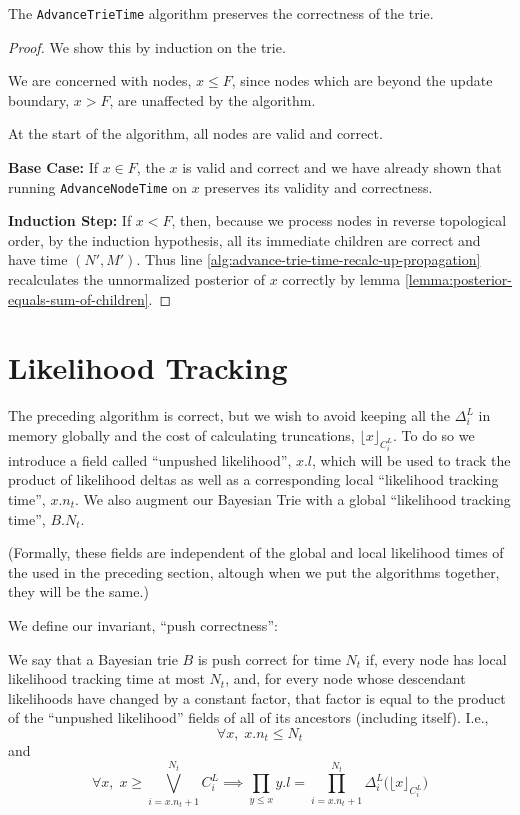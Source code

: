 \begin{theorem}
    The \texttt{AdvanceTrieTime} algorithm preserves the correctness of the trie.
\end{theorem}
\begin{proof}
    We show this by induction on the trie.

    We are concerned with nodes, $x \leq F$, since nodes
    which are beyond the update boundary, $x > F$, are unaffected
    by the algorithm.

    At the start of the algorithm, all nodes are valid and correct.
    
    \textbf{Base Case: } If $x \in F$, the $x$ is valid and correct
    and we have already shown that running \texttt{AdvanceNodeTime} on $x$ preserves its validity and correctness.

    \textbf{Induction Step: } If $x < F$, then, because
    we process nodes in reverse topological order, by the induction hypothesis,
    all its immediate children are correct and have time $(N', M')$.
    Thus line \ref{alg:advance-trie-time-recalc-up-propagation} recalculates the unnormalized posterior of $x$ correctly
    by lemma \ref{lemma:posterior-equals-sum-of-children}.
\end{proof}



\section{Likelihood Tracking}
\label{sec:likelihood-tracking}
The preceding algorithm is correct, but we wish to avoid keeping all the
$\Delta^L_i$ in memory globally and the cost of calculating truncations, $\lfloor x \rfloor_{C^L_i}$.
To do so we introduce a field called ``unpushed likelihood'', $x.l$, which will be used 
to track the product of likelihood deltas as well
as a corresponding local ``likelihood tracking time'', $x.n_t$. We also augment our Bayesian Trie with a global ``likelihood tracking time'', $B.N_t$.

(Formally, these fields are independent of the global and local likelihood times
of the used in the preceding section, altough when we put the algorithms together,
they will be the same.)


We define our invariant, ``push correctness'':

\begin{definition}
\label{def:push-correctness}
    We say that a Bayesian trie $B$ is push correct for time $N_t$ if,
    every node has local likelihood tracking time at most $N_t$,
    and, for every node whose descendant likelihoods have changed by a constant factor,
    that factor is equal to the product of the ``unpushed likelihood'' fields of all of its ancestors (including itself).
    I.e.,
    \[
    \forall x,\; x.n_t \leq N_t
    \]
    and
    \[
    \forall x,\; x \geq \bigvee_{i=x.n_t+1}^{N_t} C^L_i \implies \prod_{y \leq x} y.l = \prod_{i = x.n_t+1}^{N_t} \Delta^L_i\bigl(\lfloor x \rfloor_{C^L_i}\bigr)
    \]
\end{definition}

